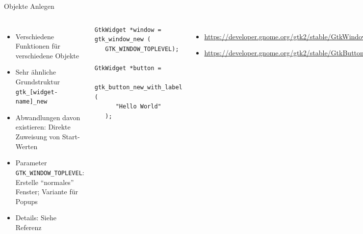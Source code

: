 \begin{frame}[fragile]{Objekte Anlegen}
%
\begin{columns}[T]
\begin{itemize}
\item Verschiedene Funktionen für verschiedene Objekte
\item Sehr ähnliche Grundstruktur\\
	\texttt{gtk\_[widget-name]\_new}
\item Abwandlungen davon existieren: Direkte Zuweisung von Start-Werten
\item Parameter \texttt{GTK\_WINDOW\_TOPLEVEL}: Erstelle \enquote{normales} Fenster; Variante für Popups
\item Details: Siehe Referenz
\end{itemize}
%
\begin{codebox}
\begin{verbatim}
GtkWidget *window = gtk_window_new (
   GTK_WINDOW_TOPLEVEL);

GtkWidget *button = 
   gtk_button_new_with_label (
      "Hello World"
   );
\end{verbatim}
\end{codebox}
%
\begin{itemize}
\item \footnotesize \url{https://developer.gnome.org/gtk2/stable/GtkWindow.html}
\item \url{https://developer.gnome.org/gtk2/stable/GtkButton.html}
\end{itemize}
\end{columns}
%
\end{frame}


